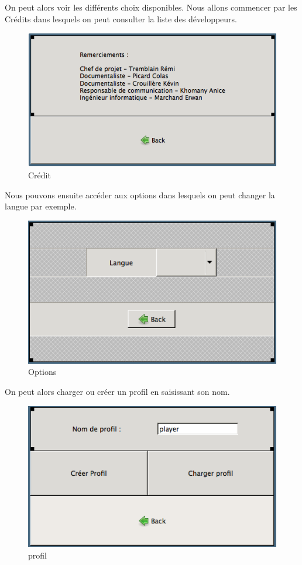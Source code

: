 \documentclass[11pt]{article}
\begin{document}
	On peut alors voir les différents choix disponibles.
	Nous allons commencer par les Crédits dans lesquels on peut consulter la liste des développeurs.
	
		\begin{figure}[!ht]
			\centering
			\includegraphics{./IHM/credits.png}
			\caption{Crédit}
		\end{figure}
		
	\FloatBarrier
		
	Nous pouvons ensuite accéder aux options dans lesquels on peut changer la langue par exemple.
	
		\begin{figure}[!ht]
			\centering
			\includegraphics{./IHM/options.png}
			\caption{Options}
		\end{figure}
		
	\FloatBarrier
	
	On peut alors charger ou créer un profil en saisissant son nom.
	
		\begin{figure}[!ht]
			\centering
			\includegraphics{./IHM/profil.png}
			\caption{profil}
		\end{figure}
	
\end{document}
